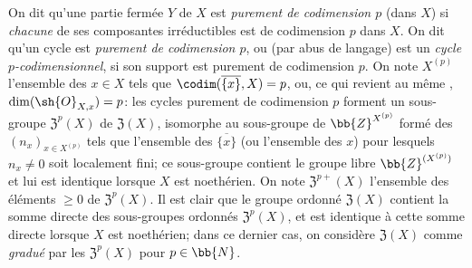 \begin{env}[21.6.2]
\label{IV.21.6.2}
On dit qu'une partie fermée $Y$ de $X$ est \emph{purement de codimension $p$} (dans $X$) si \emph{chacune} de ses composantes irréductibles est de codimension $p$ dans $X$.
On dit qu'un cycle est \emph{purement de codimension $p$}, ou (par abus de langage) est un \emph{cycle $p$-codimensionnel}, si son support est purement de codimension $p$.
On note $X^{(p)}$ l'ensemble des $x\in X$ tels que $\codim(\overline{\{x\}},X)=p$, ou, ce qui revient au même , $\dim(\sh{O}_{X,x})=p$:
les cycles purement de codimension $p$ forment un sous-groupe $\mathfrak{Z}^p(X)$ de $\mathfrak{Z}(X)$, isomorphe au sous-groupe de $\bb{Z}^{X^{(p)}}$ formé des $(n_x)_{x\in X^{(p)}}$ tels que l'ensemble des $\overline{\{x\}}$ (ou l'ensemble des $x$) pour lesquels $n_x\neq0$ soit localement fini;
ce sous-groupe contient le groupe libre $\bb{Z}^{(X^{(p)})}$ et lui est identique lorsque $X$ est noethérien.
On note $\mathfrak{Z}^{p+}(X)$ l'ensemble des éléments $\geq0$ de $\mathfrak{Z}^p(X)$.
Il est clair que le groupe ordonné $\mathfrak{Z}(X)$ contient la somme directe des sous-groupes ordonnés $\mathfrak{Z}^p(X)$, et est identique à cette somme directe lorsque $X$ est noethérien;
dans ce dernier cas, on considère $\mathfrak{Z}(X)$ comme \emph{gradué} par les $\mathfrak{Z}^p(X)$ pour $p\in\bb{N}$.
\end{env}

